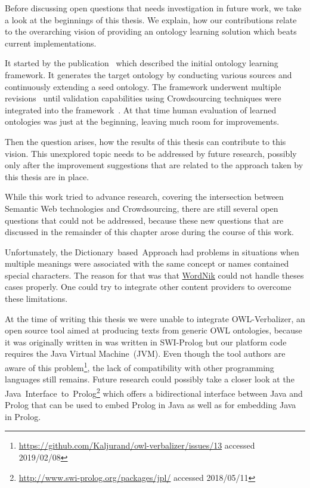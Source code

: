 Before discussing open questions that needs investigation in future work, we take a look at the beginnings of this thesis. We explain, how our contributions relate to the overarching vision of providing an ontology learning solution which beats current implementations. 

It started by the publication~\cite{liu2005semi} which described the initial ontology learning framework. It generates the target ontology by conducting various sources and continuously extending a seed ontology. The framework underwent multiple revisions~\cite{weichselbraun2010_a, weichselbraun2010_b} until validation capabilities using Crowdsourcing techniques were integrated into the framework~\cite{wohlgenannt2012}.  
At that time human evaluation of learned ontologies was just at the beginning, leaving much room for improvements. 

Then the question arises, how the results of this thesis can contribute to this vision. This unexplored topic needs to be addressed by future research, possibly only after the improvement suggestions that are related to the approach taken by this thesis are in place. 

While this work tried to advance research, covering the intersection between Semantic Web technologies and Crowdsourcing, there are still several open questions that could not be addressed, because these new questions that are discussed in the remainder of this chapter arose during the course of this work.

Unfortunately, the Dictionary~based~Approach had problems in situations when multiple meanings were associated with the same concept or names contained special characters. The reason for that was that \hyperref[sec:wordnik]{WordNik} could not handle theses cases properly. One could try to integrate other content providers to overcome these limitations. 

At the time of writing this thesis we were unable to integrate OWL-Verbalizer, an open source tool aimed at producing texts from generic OWL ontologies, because it was originally written in was written in SWI-Prolog but our platform code requires the Java Virtual Machine~(JVM). Even though the tool authors are aware of this problem\footnote{\url{https://github.com/Kaljurand/owl-verbalizer/issues/13} accessed 2019/02/08}, the lack of compatibility with other programming languages still remains. Future research could possibly take a closer look at the Java~Interface~to~Prolog\footnote{\url{http://www.swi-prolog.org/packages/jpl/} accessed 2018/05/11} which offers a bidirectional interface between Java and Prolog that can be used to embed Prolog in Java as well as for embedding Java in Prolog. 


